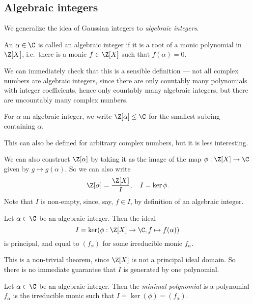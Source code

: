 \documentclass[a4paper]{article}
\begin{document}
\subsection{Algebraic integers}
We generalize the idea of Gaussian integers to \emph{algebraic integers}.

\begin{defi}
  An $\alpha \in \C$ is called an algebraic integer if it is a root of a monic polynomial in $\Z[X]$, i.e.\ there is a monic $f \in \Z[X]$ such that $f(\alpha) = 0$.
\end{defi}

We can immediately check that this is a sensible definition --- not all complex numbers are algebraic integers, since there are only countably many polynomials with integer coefficients, hence only countably many algebraic integers, but there are uncountably many complex numbers.

\begin{notation}
  For $\alpha$ an algebraic integer, we write $\Z[\alpha] \leq \C$ for the smallest subring containing $\alpha$.
\end{notation}
This can also be defined for arbitrary complex numbers, but it is less interesting.

We can also construct $\Z[\alpha]$ by taking it as the image of the map $\phi: \Z[X] \to \C$ given by $g \mapsto g(\alpha)$. So we can also write
\[
  \Z[\alpha] = \frac{\Z[X]}{I},\quad I = \ker \phi.
\]
Note that $I$ is non-empty, since, say, $f \in I$, by definition of an algebraic integer.
\begin{prop}
  Let $\alpha \in \C$ be an algebraic integer. Then the ideal
  \[
    I = \ker(\phi: \Z[X] \to \C, f \mapsto f(\alpha))
  \]
  is principal, and equal to $(f_\alpha)$ for some irreducible monic $f_\alpha$.
\end{prop}
This is a non-trivial theorem, since $\Z[X]$ is not a principal ideal domain. So there is no immediate guarantee that $I$ is generated by one polynomial.

\begin{defi}
  Let $\alpha \in \C$ be an algebraic integer. Then the \emph{minimal polynomial} is a polynomial $f_\alpha$ is the irreducible monic such that $I = \ker(\phi) = (f_\alpha)$.
\end{defi}
\end{document}
